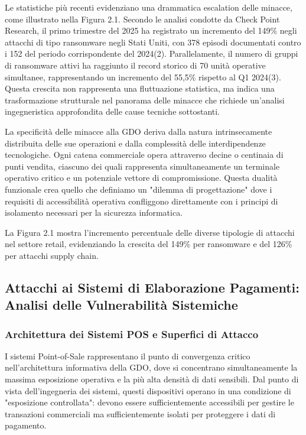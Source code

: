 \documentclass[12pt,a4paper,oneside]{book}
\begin{document}
Le statistiche più recenti evidenziano una drammatica escalation delle minacce, come illustrato nella Figura 2.1. Secondo le analisi condotte da Check Point Research, il primo trimestre del 2025 ha registrato un incremento del 149\% negli attacchi di tipo ransomware negli Stati Uniti, con 378 episodi documentati contro i 152 del periodo corrispondente del 2024(2). Parallelamente, il numero di gruppi di ransomware attivi ha raggiunto il record storico di 70 unità operative simultanee, rappresentando un incremento del 55,5\% rispetto al Q1 2024(3). Questa crescita non rappresenta una fluttuazione statistica, ma indica una trasformazione strutturale nel panorama delle minacce che richiede un'analisi ingegneristica approfondita delle cause tecniche sottostanti.

La specificità delle minacce alla GDO deriva dalla natura intrinsecamente distribuita delle sue operazioni e dalla complessità delle interdipendenze tecnologiche. Ogni catena commerciale opera attraverso decine o centinaia di punti vendita, ciascuno dei quali rappresenta simultaneamente un terminale operativo critico e un potenziale vettore di compromissione. Questa dualità funzionale crea quello che definiamo un "dilemma di progettazione" dove i requisiti di accessibilità operativa confliggono direttamente con i principi di isolamento necessari per la sicurezza informatica.

La Figura 2.1 mostra l'incremento percentuale delle diverse tipologie di attacchi nel settore retail, evidenziando la crescita del 149\% per ransomware e del 126\% per attacchi supply chain.

\subsection{Attacchi ai Sistemi di Elaborazione Pagamenti: Analisi delle Vulnerabilità Sistemiche}

\subsubsection{Architettura dei Sistemi POS e Superfici di Attacco}

I sistemi Point-of-Sale rappresentano il punto di convergenza critico nell'architettura informativa della GDO, dove si concentrano simultaneamente la massima esposizione operativa e la più alta densità di dati sensibili. Dal punto di vista dell'ingegneria dei sistemi, questi dispositivi operano in una condizione di "esposizione controllata": devono essere sufficientemente accessibili per gestire le transazioni commerciali ma sufficientemente isolati per proteggere i dati di pagamento.
\end{document}
